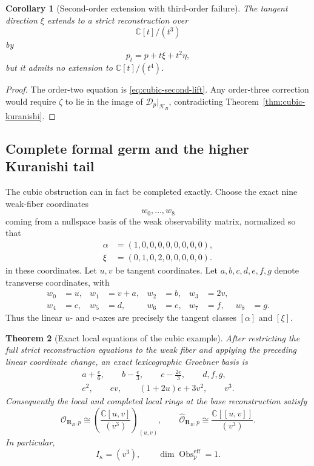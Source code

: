 \documentclass[11pt]{amsart}
\newtheorem{theorem}{Theorem}[section]
\newtheorem{corollary}[theorem]{Corollary}
\newcommand{\Obs}{\operatorname{Obs}}
\newcommand{\cO}{\mathcal O}
\newcommand{\cD}{\mathscr D}
\newcommand{\C}{\mathbb C}
\begin{document}
\begin{corollary}[Second-order extension with third-order failure]\label{cor:cubic-failure}
The tangent direction $\xi$ extends to a strict reconstruction over
\[
\C[t]/(t^3)
\]
by
\[
p_t=p+t\xi+t^2\eta,
\]
but it admits no extension to $\C[t]/(t^4)$.
\end{corollary}

\begin{proof}
The order-two equation is \eqref{eq:cubic-second-lift}.  Any order-three correction would require $\zeta$ to lie in the image of $\cD_p|_{\mathcal K_B}$, contradicting Theorem~\ref{thm:cubic-kuranishi}.
\end{proof}


\subsection{Complete formal germ and the higher Kuranishi tail}\label{subsec:cubic-complete-germ}

The cubic obstruction can in fact be completed exactly.  Choose the exact nine weak-fiber coordinates
\[
w_0,\ldots,w_8
\]
coming from a nullspace basis of the weak observability matrix, normalized so that
\[
\begin{aligned}
\alpha&=(1,0,0,0,0,0,0,0,0),\\
\xi&=(0,1,0,2,0,0,0,0,0).
\end{aligned}
\]
in these coordinates.  Let $u,v$ be tangent coordinates.  Let
$a,b,c,d,e,f,g$ denote transverse coordinates, with
\[
\begin{aligned}
w_0&=u, & w_1&=v+a, & w_2&=b, & w_3&=2v,\\
w_4&=c, & w_5&=d, & w_6&=e, & w_7&=f, & w_8&=g.
\end{aligned}
\]
Thus the linear $u$- and $v$-axes are precisely the tangent classes $[\alpha]$ and $[\xi]$.

\begin{theorem}[Exact local equations of the cubic example]\label{thm:cubic-complete-germ}
After restricting the full strict reconstruction equations to the weak fiber and applying the preceding linear coordinate change, an exact lexicographic Groebner basis is
\[
\boxed{
\begin{gathered}
a+\frac e6,
\qquad
b-\frac e3,
\qquad
c-\frac{2e}{3},
\qquad
d,
f,
g,\\
e^2,
\qquad
ev,
\qquad
(1+2u)e+3v^2,
\qquad
v^3.
\end{gathered}}
\]
Consequently the local and completed local rings at the base reconstruction satisfy
\[
\cO_{\mathbf R_B,p}
\cong
\left(\frac{\C[u,v]}{(v^3)}\right)_{(u,v)},
\qquad
\boxed{
\widehat{\cO}_{\mathbf R_B,p}
\cong
\frac{\C[[u,v]]}{(v^3)}.
}
\]
In particular,
\[
I_\kappa=(v^3),
\qquad
\dim\Obs^{\mathrm{eff}}_p=1.
\]
\end{theorem}
\end{document}
